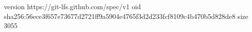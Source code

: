 version https://git-lfs.github.com/spec/v1
oid sha256:56ece3f657e73677d2721ff9a5904e4765f3d2d233fcf8109c4b470b5d828de8
size 3055
